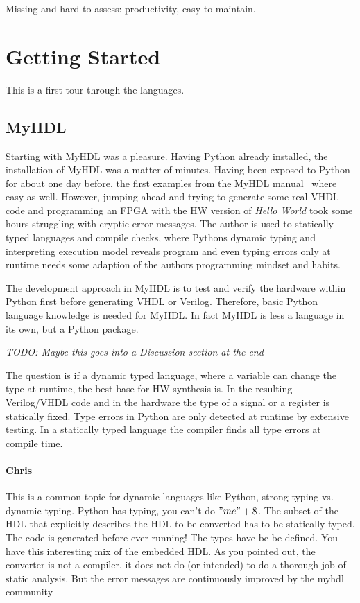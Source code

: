 \documentclass[a4paper, conference]{IEEEtran}
\newcommand{\todo}[1]{{\emph{TODO: #1}}}
\newcommand{\comment}[3]{\paragraph*{\textbf{#1}}{\color{#3}#2}}
\newcommand{\cfelton}[1]{\comment{Chris}{#1}{Blue}}
\begin{document}
Missing and hard to assess: productivity, easy to maintain.

\section{Getting Started}

This is a first tour through the languages.

\subsection{MyHDL}

Starting with MyHDL was a pleasure. Having Python already installed, the installation
of MyHDL was a matter of minutes. Having been exposed to Python for about one
day before, the first examples from the MyHDL manual~\cite{myhdl:2010} where easy as well.
However, jumping ahead and trying to generate some real VHDL code and programming
an FPGA with the HW version of \emph{Hello World} took some hours struggling
with cryptic error messages. The author is used to statically typed languages and
compile checks, where Pythons dynamic typing and interpreting execution model
reveals program and even typing errors only at runtime needs some adaption of
the authors programming mindset and habits.

The development approach in MyHDL is to test and verify the hardware within Python first
before generating VHDL or Verilog. Therefore, basic Python language knowledge is
needed for MyHDL. In fact MyHDL is less a language in its own, but a Python package.

\todo{Maybe this goes into a Discussion section at the end}

The question is if a dynamic typed language, where a variable can change the type
at runtime, the best base for HW synthesis is. In the resulting Verilog/VHDL code and
in the hardware the type of a signal or a register is statically fixed. Type errors in
Python are only detected at runtime by extensive testing. In a statically typed
language the compiler finds all type errors at compile time.

\cfelton{This is a common topic for dynamic languages like Python, strong typing
vs. dynamic typing.  Python has typing, you can't do $"me"+8$.  The subset of 
the HDL that explicitly describes the HDL to be converted has to be statically
typed.  The code is generated before ever running!  The types have be be defined.
You have this interesting mix of the embedded HDL.  As you pointed out, the converter
is not a compiler, it does not do (or intended) to do a thorough job of static 
analysis.  But the error messages are continuously improved by the myhdl community}
\end{document}
